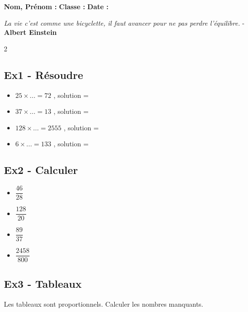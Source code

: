 



\textbf{Nom, Prénom :} \hspace{8cm} \textbf{Classe :} \hspace{3cm} \textbf{Date :}\\

\begin{center}
  \textit{La vie c’est comme une bicyclette, il faut avancer pour ne pas perdre l’équilibre.} - \textbf{Albert Einstein}
\end{center}

\begin{multicols}{2}
\subsection*{Ex1 - Résoudre} 

\begin{itemize}[label={$\bullet$}]
  \item $ 25 \times ... = 72$ , solution = \dotfill 
  \item $ 37 \times ... = 13$ , solution = \dotfill 
  \item $ 128 \times ... = 2555$  , solution = \dotfill 
  \item $ 6 \times ... = 133$ , solution = \dotfill 
\end{itemize}\columnbreak


\subsection*{Ex2 - Calculer} 

\begin{itemize}[label={$\bullet$}]
  \item $ \dfrac{46}{28} $ \dotfill 
  \item $ \dfrac{128}{20} $ \dotfill 
  \item $ \dfrac{89}{37} $ \dotfill 
  \item $ \dfrac{2458}{800} $ \dotfill 
\end{itemize}
\end{multicols}


\subsection*{Ex3 - Tableaux} 

Les tableaux sont proportionnels. Calculer les nombres manquants. 

